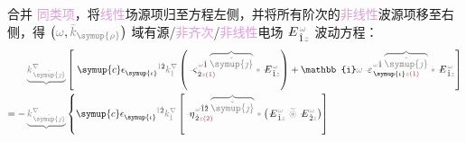 合并  \textcolor{Plum}{同类项}，将\textcolor{Plum}{线性}场源项归至方程左侧，并将所有阶次的\textcolor{Plum}{非线性}\textcolor{NavyBlue}{波源}项移至右侧，得 $\left( \mathcolor{gray}{\omega}, \mathcolor{gray}{\bar{k}_{\symup{\rho}}} \right)$ 域\textcolor{NavyBlue}{有源}/\textcolor{Plum}{非齐次}/\textcolor{Plum}{非线性}电场 $\xint{\mathcolor{gray}{-}}{295}{E}^{\;\!\mathcolor{gray}{\omega}}_{\;\! \hat{1} \mathcolor{gray}{z}}$ 波动方程：
\begin{subequations}
	\belowdisplayskip=3pt
\begin{align}
	&\mathcolor{gray}{\underbrace{k^\nabla_{\;\! \check{\symup{\jmath}}}}} \left[~ {\symup{c}} \epsilon^{\hphantom{\symup{\iota}}\mathcolor{gray}{\dot{1}}\dot{2}}_{\symup{\iota}} \mathcolor{gray}{k^\nabla_{\dot{1}}} \left( \xint{\begin{smallmatrix} ~ \\ {}^{}_{\mathcolor{gray}{-}} \\ ~ \end{smallmatrix}}{13}{\varsigma}^{\;\! \mathcolor{gray}{\omega} \hat{1} \;\! \mathcolor{gray}{\overbrace{\check{\symup{\jmath}}}}}_{\;\! \dot{2} \mathcolor{gray}{z} \textcolor{Maroon}{(1)}} \mathcolor{gray}{*} \xint{\mathcolor{gray}{-}}{295}{E}^{\;\!\mathcolor{gray}{\omega}}_{\;\! \hat{1} \mathcolor{gray}{z}} \right) + \mathbb{i} \mathcolor{gray}{\omega} \xint{\begin{smallmatrix} ~ \\ {}^{}_{\mathcolor{gray}{-}} \\ ~ \end{smallmatrix}}{16}{\varepsilon}^{\;\! \mathcolor{gray}{\omega} \hat{1} \;\! \mathcolor{gray}{\overbrace{\check{\symup{\jmath}}}}}_{\;\! \symup{\iota} \mathcolor{gray}{z} \textcolor{Maroon}{(1)}} \mathcolor{gray}{*} \xint{\mathcolor{gray}{-}}{295}{E}^{\;\!\mathcolor{gray}{\omega}}_{\;\! \hat{1} \mathcolor{gray}{z}} \right]  \label{eq:nonlinear-wave_wkrho} \\ = - &\mathcolor{gray}{\underbrace{k^\nabla_{\;\! \check{\symup{\jmath}}}}} \left\{ {\symup{c}} \epsilon^{\hphantom{\symup{\iota}}\mathcolor{gray}{\dot{1}}\dot{2}}_{\symup{\iota}} \mathcolor{gray}{k^\nabla_{\dot{1}}} \left[ \xint{\begin{smallmatrix} ~ \\ {}^{}_{\mathcolor{gray}{-}} \\ ~ \end{smallmatrix}}{17}{\eta}^{\;\! \mathcolor{gray}{\omega} \hat{1} \hat{2} \;\! \mathcolor{gray}{\overbrace{\check{\symup{\jmath}}}}}_{\;\! \dot{2} \mathcolor{gray}{z} \textcolor{Maroon}{(2)}} \mathcolor{gray}{*} \left( \xint{\mathcolor{gray}{-}}{295}{E}^{\;\!\mathcolor{gray}{\omega}}_{\;\! \hat{1} \mathcolor{gray}{z}} ~\mathcolor{gray}{\widetilde \circledast}~ \xint{\mathcolor{gray}{-}}{295}{E}^{\;\!\mathcolor{gray}{\omega}}_{\;\! \hat{2} \mathcolor{gray}{z}} \right) \right] \right. \\ 

\end{align}
\end{subequations}
